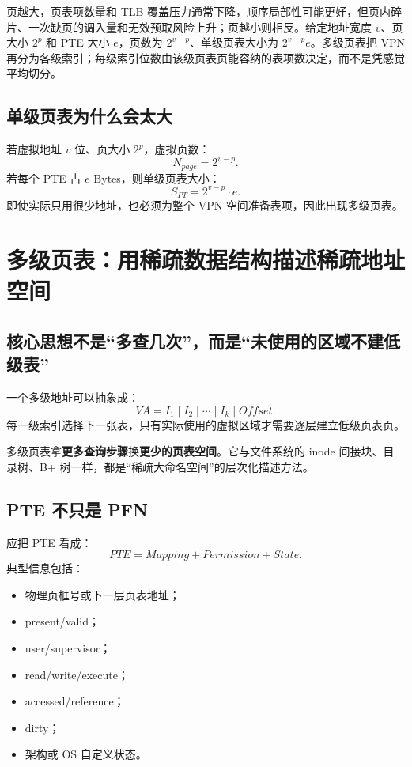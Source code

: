 \documentclass[11pt,a4paper]{ctexart}
\newcommand{\kw}[1]{\textbf{#1}}
\begin{document}
\begin{exam}[页大小与位数推导]
页越大，页表项数量和 TLB 覆盖压力通常下降，顺序局部性可能更好，但页内碎片、一次缺页的调入量和无效预取风险上升；页越小则相反。给定地址宽度 $v$、页大小 $2^p$ 和 PTE 大小 $e$，页数为 $2^{v-p}$、单级页表大小为 $2^{v-p}e$。多级页表把 VPN 再分为各级索引；每级索引位数由该级页表页能容纳的表项数决定，而不是凭感觉平均切分。
\end{exam}

\subsection{单级页表为什么会太大}
若虚拟地址 $v$ 位、页大小 $2^p$，虚拟页数：
\[
N_{page}=2^{v-p}.
\]
若每个 PTE 占 $e$ Bytes，则单级页表大小：
\[
S_{PT}=2^{v-p}\cdot e.
\]
即使实际只用很少地址，也必须为整个 VPN 空间准备表项，因此出现多级页表。

\section{多级页表：用稀疏数据结构描述稀疏地址空间}

\subsection{核心思想不是“多查几次”，而是“未使用的区域不建低级表”}
一个多级地址可以抽象成：
\[
VA=I_1\mid I_2\mid\cdots\mid I_k\mid Offset.
\]
每一级索引选择下一张表，只有实际使用的虚拟区域才需要逐层建立低级页表页。

\begin{center}

\end{center}

\begin{bridge}
多级页表拿\kw{更多查询步骤}换\kw{更少的页表空间}。它与文件系统的 inode 间接块、目录树、B+ 树一样，都是“稀疏大命名空间”的层次化描述方法。
\end{bridge}

\subsection{PTE 不只是 PFN}
应把 PTE 看成：
\[
\boxed{PTE=Mapping+Permission+State}.
\]
典型信息包括：
\begin{itemize}
  \item 物理页框号或下一层页表地址；
  \item present/valid；
  \item user/supervisor；
  \item read/write/execute；
  \item accessed/reference；
  \item dirty；
  \item 架构或 OS 自定义状态。
\end{itemize}
\end{document}
